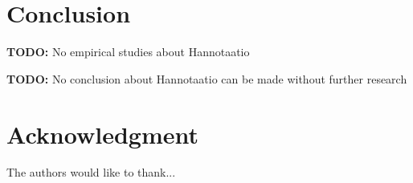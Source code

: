 \documentclass[conference]{IEEEtran}
\begin{document}
%





\section{Conclusion}


\textbf{TODO:} No empirical studies about Hannotaatio

\textbf{TODO:} No conclusion about Hannotaatio can be made without further research

\section*{Acknowledgment}


The authors would like to thank...





\end{document}
